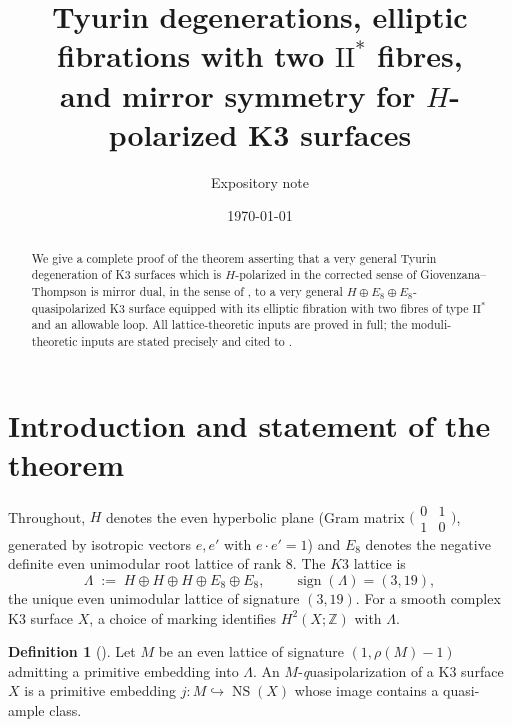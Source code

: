 \documentclass[11pt]{amsart}
\theoremstyle{plain}
\theoremstyle{definition}
\newtheorem{definition}[theorem]{Definition}
\theoremstyle{remark}
\numberwithin{equation}{section}
\begin{document}
\title[Mirror symmetry for Tyurin degenerations of \(H\)-polarized K3 surfaces]
{Tyurin degenerations, elliptic fibrations with two \(\mathrm{II}^{*}\) fibres,\\
and mirror symmetry for \(H\)-polarized K3 surfaces}

\author{Expository note}
\date{\today}

\begin{abstract}
We give a complete proof of the theorem asserting that a very general Tyurin
degeneration of K3 surfaces which is \(H\)-polarized in the corrected sense of
Giovenzana--Thompson is mirror dual, in the sense of \cite{dfk3slpms},
to a very general \(H\oplus E_{8}\oplus E_{8}\)-quasipolarized K3 surface
equipped with its elliptic fibration with two fibres of type $\mathrm{II}^{*}$
and an allowable loop. All lattice-theoretic inputs are proved in full;
the moduli-theoretic inputs are stated precisely and cited to
\cite{cmek3sspt, dfk3slpms}.
\end{abstract}

\maketitle

\section{Introduction and statement of the theorem}\label{S:intro}

Throughout, \(H\) denotes the even hyperbolic plane (Gram matrix
\(\bigl(\begin{smallmatrix}0&1\\1&0\end{smallmatrix}\bigr)\), generated by
isotropic vectors \(e,e'\) with \(e\cdot e'=1\)) and \(E_{8}\) denotes the
negative definite even unimodular root lattice of rank \(8\). The \(K3\)
lattice is
\[
\Lambda \;:=\; H\oplus H\oplus H\oplus E_{8}\oplus E_{8},
\qquad \operatorname{sign}(\Lambda)=(3,19),
\]
the unique even unimodular lattice of signature \((3,19)\).
For a smooth complex K3 surface \(X\), a choice of marking identifies
\(H^{2}(X;\mathbb Z)\) with \(\Lambda\).

\begin{definition}[{\cite{dolgachevmirror}}]\label{D:lattice-pol}
Let \(M\) be an even lattice of signature \((1,\rho(M)-1)\) admitting a
primitive embedding into \(\Lambda\). An \(M\)-{\emph quasipolarization} of a
K3 surface \(X\) is a primitive embedding \(j\colon M\hookrightarrow
\operatorname{NS}(X)\) whose image contains a quasi-ample class.
\end{definition}
\end{document}
